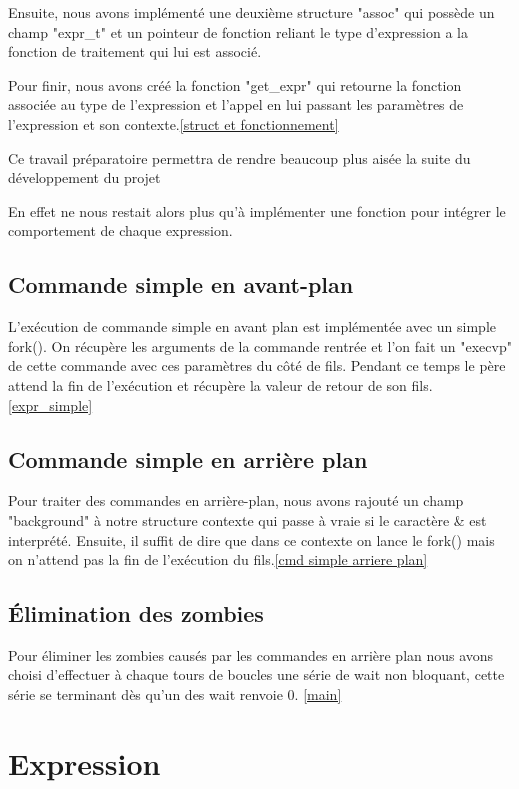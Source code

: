 \documentclass[12pt]{article}
\begin{document}
 Ensuite, nous avons implémenté une deuxième structure "assoc" qui possède un champ "expr\_t"
 et un pointeur de fonction reliant le type d'expression a la fonction de traitement
 qui lui est associé.
 
 Pour finir, nous avons créé la fonction "get\_expr" qui retourne la fonction associée au 
 type de l'expression et l'appel en lui passant les paramètres de l'expression et son 
 contexte.\ref{struct et fonctionnement}
 
 Ce travail préparatoire permettra de rendre beaucoup plus aisée la suite du développement
 du projet
 
 En effet ne nous restait alors plus qu'à implémenter une fonction pour intégrer le comportement
 de chaque expression.
 
 \subsection{Commande simple en avant-plan}
 
 L'exécution de commande simple en avant plan est implémentée avec un simple fork().
 On récupère les arguments de la commande rentrée et l'on fait un "execvp" de cette commande
 avec ces paramètres du côté de fils. Pendant ce temps le père attend la fin de l'exécution
 et récupère la valeur de retour de son fils.\ref{expr_simple}
 
 \subsection{Commande simple en arrière plan}
 
 Pour traiter des commandes en arrière-plan, nous avons rajouté un champ "background"
à notre structure contexte qui passe à vraie si le caractère \& est interprété.
 Ensuite, il suffit de dire que dans ce contexte on lance le fork() mais on n’attend pas
la fin de l'exécution du fils.\ref{cmd simple arriere plan}
 
 
 \subsection{Élimination des zombies}

 Pour éliminer les zombies causés par les commandes en arrière plan nous avons choisi d'effectuer
 à chaque tours de boucles une série de wait non bloquant, cette série se terminant dès qu'un des
 wait renvoie 0. \ref{main}
 

\newpage
\section{Expression}
\end{document}
